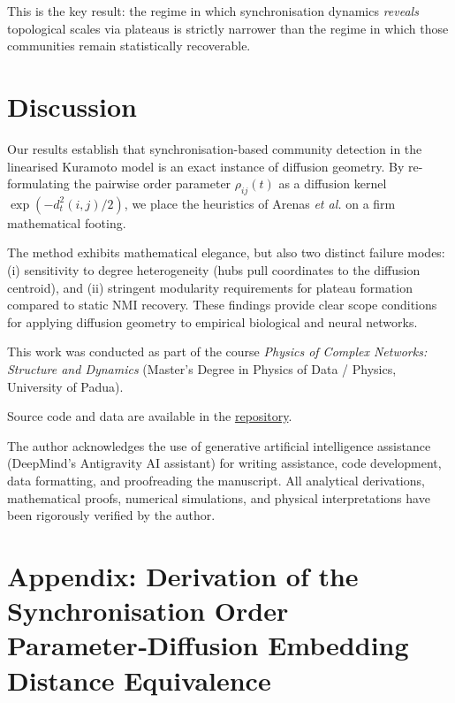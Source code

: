 \documentclass[twocolumn,aps,prl,superscriptaddress,nofootinbib]{revtex4-2}
\theoremstyle{plain}
\theoremstyle{definition}
\begin{document}
This is the key result: the regime in which synchronisation dynamics \textit{reveals} topological scales via plateaus is strictly narrower than the regime in which those communities remain statistically recoverable.

\section{Discussion}
\label{sec:discussion}

Our results establish that synchronisation-based community detection in the linearised Kuramoto model is an exact instance of diffusion geometry. By re-formulating the pairwise order parameter $\rho_{ij}(t)$ as a diffusion kernel $\exp(-d_t^2(i,j)/2)$, we place the heuristics of Arenas \textit{et al.} on a firm mathematical footing.

The method exhibits mathematical elegance, but also two distinct failure modes: (i) sensitivity to degree heterogeneity (hubs pull coordinates to the diffusion centroid), and (ii) stringent modularity requirements for plateau formation compared to static NMI recovery. These findings provide clear scope conditions for applying diffusion geometry to empirical biological and neural networks.

\begin{acknowledgments}
This work was conducted as part of the course \emph{Physics of Complex Networks: Structure and Dynamics} (Master's Degree in Physics of Data / Physics, University of Padua).

Source code and data are available in the \href{https://github.com/filippobezzi/PoCN_projects}{repository}. 

The author acknowledges the use of generative artificial intelligence assistance (DeepMind's Antigravity AI assistant) for writing assistance, code development, data formatting, and proofreading the manuscript. All analytical derivations, mathematical proofs, numerical simulations, and physical interpretations have been rigorously verified by the author.
\end{acknowledgments}




\appendix
{}
\section{Appendix: Derivation of the Synchronisation Order Parameter‑Diffusion Embedding Distance Equivalence}\label{app:derivation}
\end{document}
